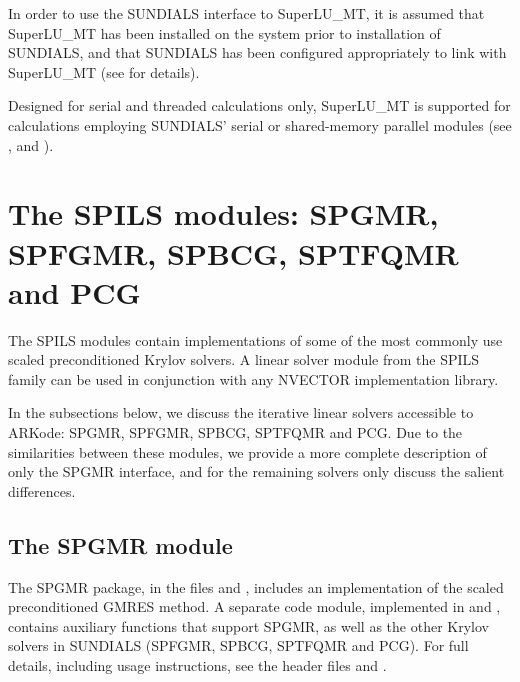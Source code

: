 \documentclass[letterpaper,10pt,english]{sphinxmanual}
\begin{document}
In order to use the SUNDIALS interface to SuperLU\_MT, it is assumed
that SuperLU\_MT has been installed on the system prior to installation
of SUNDIALS, and that SUNDIALS has been configured appropriately to
link with SuperLU\_MT (see {\hyperref[Install:installation]{\emph{}}} for details).

Designed for serial and threaded calculations only, SuperLU\_MT is
supported for calculations employing SUNDIALS' serial or shared-memory
parallel  modules (see {\hyperref[nvectors/NVector_Serial:nvectors-nvserial]{\emph{}}},
{\hyperref[nvectors/NVector_OpenMP:nvectors-openmp]{\emph{}}} and {\hyperref[nvectors/NVector_Pthreads:nvectors-pthreads]{\emph{}}}).


\section{The SPILS modules: SPGMR, SPFGMR, SPBCG, SPTFQMR and PCG}
\label{linear_solvers/SPILS:the-spils-modules-spgmr-spfgmr-spbcg-sptfqmr-and-pcg}\label{linear_solvers/SPILS:linearsolvers-spils}\label{linear_solvers/SPILS::doc}
The SPILS modules contain implementations of some of the most commonly
use scaled preconditioned Krylov solvers.  A linear solver module from
the SPILS family can be used in conjunction with any NVECTOR
implementation library.

In the subsections below, we discuss the iterative linear solvers
accessible to ARKode: SPGMR, SPFGMR, SPBCG, SPTFQMR and PCG.  Due to
the similarities between these modules, we provide a more complete
description of only the SPGMR interface, and for the remaining solvers
only discuss the salient differences.


\subsection{The SPGMR module}
\label{linear_solvers/SPILS:the-spgmr-module}
The SPGMR package, in the files  and
, includes an implementation of the scaled
preconditioned GMRES method.  A separate code module, implemented in
 and , contains
auxiliary functions that support SPGMR, as well as the other Krylov
solvers in SUNDIALS (SPFGMR, SPBCG, SPTFQMR and PCG).  For full
details, including usage instructions, see the header files
 and .
\end{document}
